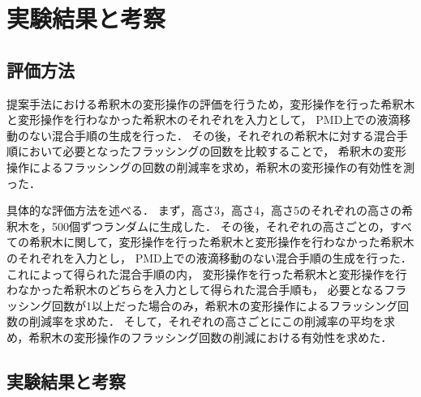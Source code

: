 \chapter{実験結果と考察}

\section{評価方法}
提案手法における希釈木の変形操作の評価を行うため，変形操作を行った希釈木と変形操作を行わなかった希釈木のそれぞれを入力として，
PMD上での液滴移動のない混合手順の生成を行った．
その後，それぞれの希釈木に対する混合手順において必要となったフラッシングの回数を比較することで，
希釈木の変形操作によるフラッシングの回数の削減率を求め，希釈木の変形操作の有効性を測った．

具体的な評価方法を述べる．
まず，高さ3，高さ4，高さ5のそれぞれの高さの希釈木を，500個ずつランダムに生成した．
その後，それぞれの高さごとの，すべての希釈木に関して，変形操作を行った希釈木と変形操作を行わなかった希釈木のそれぞれを入力とし，
PMD上での液滴移動のない混合手順の生成を行った．
これによって得られた混合手順の内，
変形操作を行った希釈木と変形操作を行わなかった希釈木のどちらを入力として得られた混合手順も，
必要となるフラッシング回数が1以上だった場合のみ，希釈木の変形操作によるフラッシング回数の削減率を求めた．
そして，それぞれの高さごとにこの削減率の平均を求め，希釈木の変形操作のフラッシング回数の削減における有効性を求めた．

\section{実験結果と考察}
